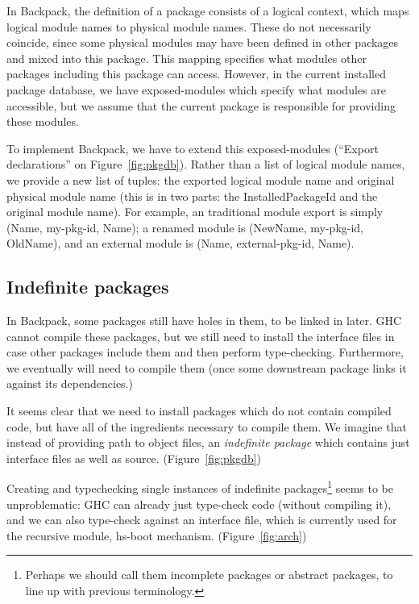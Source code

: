 \documentclass{article}
\begin{document}
In Backpack, the definition of a package consists of a logical context,
which maps logical module names to physical module names.  These do not
necessarily coincide, since some physical modules may have been defined
in other packages and mixed into this package.  This mapping specifies
what modules other packages including this package can access.
However, in the current installed package database, we have exposed-modules which
specify what modules are accessible, but we assume that the current
package is responsible for providing these modules.

To implement Backpack, we have to extend this exposed-modules (``Export declarations''
on Figure~\ref{fig:pkgdb}).  Rather
than a list of logical module names, we provide a new list of tuples:
the exported logical module name and original physical module name (this
is in two parts: the InstalledPackageId and the original module name).
For example, an traditional module export is simply (Name, my-pkg-id, Name);
a renamed module is (NewName, my-pkg-id, OldName), and an external module
is (Name, external-pkg-id, Name).

\subsection{Indefinite packages}\label{sec:indefinite-packages}

In Backpack, some packages still have holes in them, to be linked in
later.  GHC cannot compile these packages, but we still need to install
the interface files in case other packages include them and then perform
type-checking.  Furthermore, we eventually will need to compile them
(once some downstream package links it against its dependencies.)

It seems clear that we need to install packages which do not contain
compiled code, but have all of the ingredients necessary to compile them.
We imagine that instead of providing path to object files, an \emph{indefinite
package} which contains just interface files as well as source. (Figure~\ref{fig:pkgdb})

Creating and typechecking single instances of indefinite packages\footnote{Perhaps we should call them incomplete packages or abstract packages, to line up with previous terminology.} seems to
be unproblematic: GHC can already just type-check code (without compiling it),
and we can also type-check against an interface file, which is currently used for
the recursive module, hs-boot mechanism. (Figure~\ref{fig:arch})
\end{document}
